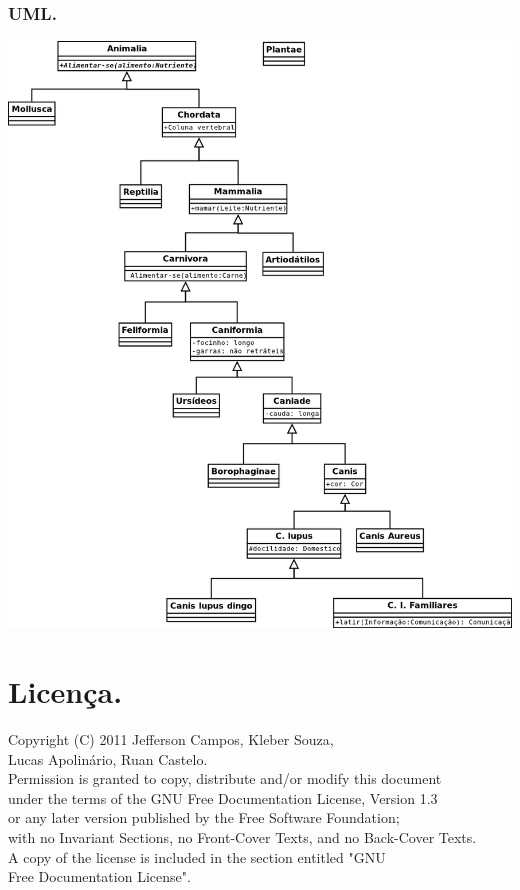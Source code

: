 \documentclass[a4paper,12pt]{article}
\begin{document}
\subsubsection{UML.}
\includegraphics[width=1.15\textwidth]{./seminar_ecology.png}\\[1cm]

\section{Licença.}

Copyright (C)  2011 Jefferson Campos, Kleber Souza,\\
Lucas Apolinário, Ruan Castelo.\\
Permission is granted to copy, distribute and/or modify this document\\
under the terms of the GNU Free Documentation License, Version 1.3\\
or any later version published by the Free Software Foundation;\\
with no Invariant Sections, no Front-Cover Texts, and no Back-Cover Texts.\\
A copy of the license is included in the section entitled "GNU\\
Free Documentation License".

\nocite{MUNARI:2006}
\nocite{website:simulacao}
\nocite{website:cibernetica}
\nocite{website:cibernetica_GEROVITCH}
\nocite{website:cibernetica_MEDINA}
\nocite{website:cibernetica_WIENER}
\nocite{website:teoria_sistemas}
\nocite{texbook:teoria_sistema_KLIR}
\nocite{texbook:teoria_sistema_CHIAVENATO}
\nocite{texbook:teoria_sistema_BERTALANFFY}
\nocite{texbook:teoria_sistema_CAPRA}
\nocite{website:r_project}


\end{document}
